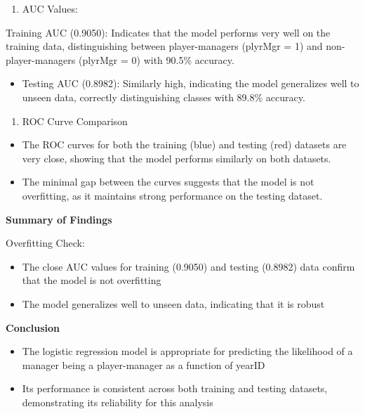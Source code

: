 \documentclass[
]{article}
\providecommand{\tightlist}{%
  \setlength{\itemsep}{0pt}\setlength{\parskip}{0pt}}
\begin{document}
\begin{enumerate}
\def\labelenumi{\arabic{enumi}.}
\tightlist
\item
  AUC Values:
\end{enumerate}

Training AUC (0.9050): Indicates that the model performs very well on
the training data, distinguishing between player-managers (plyrMgr = 1)
and non-player-managers (plyrMgr = 0) with 90.5\% accuracy.

\begin{itemize}
\tightlist
\item
  Testing AUC (0.8982): Similarly high, indicating the model generalizes
  well to unseen data, correctly distinguishing classes with 89.8\%
  accuracy.
\end{itemize}

\begin{enumerate}
\def\labelenumi{\arabic{enumi}.}
\setcounter{enumi}{1}
\tightlist
\item
  ROC Curve Comparison
\end{enumerate}

\begin{itemize}
\item
  The ROC curves for both the training (blue) and testing (red) datasets
  are very close, showing that the model performs similarly on both
  datasets.
\item
  The minimal gap between the curves suggests that the model is not
  overfitting, as it maintains strong performance on the testing
  dataset.
\end{itemize}

\textbf{Summary of Findings}

Overfitting Check:

\begin{itemize}
\item
  The close AUC values for training (0.9050) and testing (0.8982) data
  confirm that the model is not overfitting
\item
  The model generalizes well to unseen data, indicating that it is
  robust
\end{itemize}

\textbf{Conclusion}

\begin{itemize}
\item
  The logistic regression model is appropriate for predicting the
  likelihood of a manager being a player-manager as a function of yearID
\item
  Its performance is consistent across both training and testing
  datasets, demonstrating its reliability for this analysis
\end{itemize}
\end{document}
